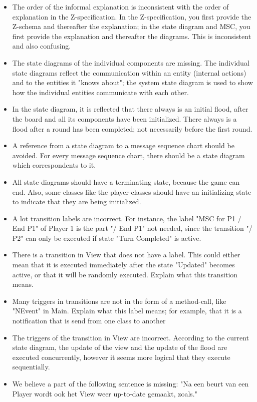 \documentclass[a4paper,11pt]{article}
\begin{document}
    \begin{itemize}
        \item The order of the informal explanation is inconsistent with the order of explanation in the Z-specification. In the Z-specification, you first provide the Z-schema and thereafter the explanation; in the state diagram and MSC, you first provide the explanation and thereafter the diagrams. This is inconsistent and also confusing.
        \item The state diagrams of the individual components are missing. The individual state diagrams reflect the communication within an entity (internal actions) and to the entities it "knows about"; the system state diagram is used to show how the individual entities communicate with each other.
        \item In the state diagram, it is reflected that there always is an initial flood, after the board and all its components have been initialized. There always is a flood after a round has been completed; not necessarily before the first round.
        \item A reference from a state diagram to a message sequence chart should be avoided. For every message sequence chart, there should be a state diagram which correspondents to it.
        \item All state diagrams should have a terminating state, because the game can end. Also, some classes like the player-classes should have an initializing state to indicate that they are being initialized.
        \item A lot transition labels are incorrect. For instance, the label "MSC for P1 / End P1" of Player 1 is the part "/ End P1" not needed, since the transition "/ P2" can only be executed if state "Turn Completed" is active.
        \item There is a transition in View that does not have a label. This could either mean that it is executed immediately after the state "Updated" becomes active, or that it will be randomly executed. Explain what this transition means.
        \item Many triggers in transitions are not in the form of a method-call, like "NEvent" in Main. Explain what this label means; for example, that it is a notification that is send from one class to another
        \item The triggers of the transition in View are incorrect. According to the current state diagram, the update of the view and the update of the flood are executed concurrently, however it seems more logical that they execute sequentially.
        \item We believe a part of the following sentence is missing: "Na een beurt van een Player wordt ook het View weer up-to-date gemaakt, zoals."
    \end{itemize}
    
\end{document}
